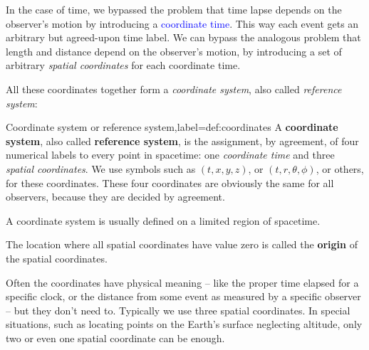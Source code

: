 \documentclass[a4paper,12pt,%
onecolumn,oneside,%
british%
]{memoir}
\renewcommand*{\|}[1][]{\nonscript\:#1\vert\nonscript\:\mathopen{}}
\newcommand*{\sect}{\S}%
\renewcommand*{\autoref}[2]{\sidepar{\vspace{-1ex}\footnotesize{\color{blue}\faIcon{%
angle-right%
}\enspace\sect~\ref{#1} page~\pageref{#1}}}\textcolor{blue}{#2}}
\begin{document}
In the case of time, we bypassed the problem that time lapse depends on the observer's motion by introducing a \autoref{sec:coord_time}{coordinate time}. This way each event gets an arbitrary but agreed-upon time label. We can bypass the analogous problem that length and distance depend on the observer's motion, by introducing a set of arbitrary \emph{spatial coordinates} for each coordinate time.

All these coordinates together form a \emph{coordinate system}, also called \emph{reference system}:
\begin{definition}{Coordinate system or reference system,label={def:coordinates}}
  A \textbf{coordinate system}, also called \textbf{reference system}, is the assignment, by agreement, of four numerical labels to every point in spacetime: one \emph{coordinate time} and three \emph{spatial coordinates}. We use symbols such as $(t,x,y,z)$, or $(t, r, \theta,\phi)$, or others, for these coordinates. These four coordinates are obviously the same for all observers, because they are decided by agreement.

  \smallskip
  
   A coordinate system is usually defined on a limited region of spacetime.

  \smallskip

  The location where all spatial coordinates have value zero is called the \textbf{origin} of the spatial coordinates.
\end{definition}

  Often the coordinates have physical meaning -- like the proper time elapsed for a specific clock, or the distance from some event as measured by a specific observer -- but they don't need to. Typically we use three spatial coordinates. In special situations, such as locating points on the Earth's surface neglecting altitude, only two or even one spatial coordinate can be enough.
\end{document}
